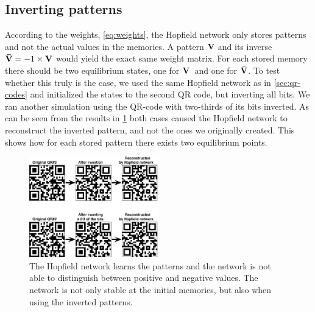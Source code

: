 \subsection{Inverting patterns}
According to the weights, \cref{eq:weights}, the Hopfield network only stores patterns and not the actual values in the memories. A pattern $\bf V$ and its inverse $\mathbf{\bar{V}} = -1 \times \bf V$ would yield the exact same weight matrix. For each stored memory there should be two equilibrium states, one for $\bf V$ and one for $\bf \bar{V}$. To test whether this truly is the case, we used the same Hopfield network as in \cref{sec:qr-codes} and initialized the states to the second QR code, but inverting all bits. We ran another simulation using the QR-code with two-thirds of its bits inverted. As can be seen from the results in \cref{fig:inverted-qr} both cases caused the Hopfield network to reconstruct the inverted pattern, and not the ones we originally created. This shows how for each stored pattern there exists two equilibrium points.
\begin{figure}[H]
    \centering
        \includegraphics[width=0.5\textwidth]{figs/qr-inverted}
        \caption{The Hopfield network learns the patterns and the network is not able to distinguish between positive and negative values. The network is not only stable at the initial memories, but also when using the inverted patterns.}
        \label{fig:inverted-qr}
\end{figure}